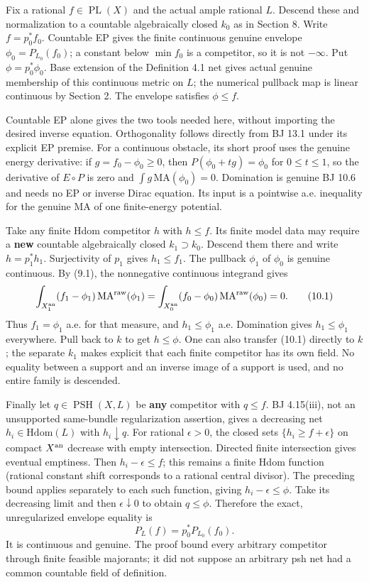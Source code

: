 \documentclass[
  10pt,
]{article}
\begin{document}
Fix a rational \(f\in\operatorname{PL}(X)\) and the actual ample
rational \(L\). Descend these and normalization to a countable
algebraically closed \(k_0\) as in Section 8. Write \(f=p_0^*f_0\).
Countable EP gives the finite continuous genuine envelope
\(\phi_0=P_{L_0}(f_0)\); a constant below \(\min f_0\) is a competitor,
so it is not \(-\infty\). Put \(\phi=p_0^*\phi_0\). Base extension of
the Definition 4.1 net gives actual genuine membership of this
continuous metric on \(L\); the numerical pullback map is linear
continuous by Section 2. The envelope satisfies \(\phi\le f\).

Countable EP alone gives the two tools needed here, without importing
the desired inverse equation. Orthogonality follows directly from BJ
13.1 under its explicit EP premise. For a continuous obstacle, its short
proof uses the genuine energy derivative: if \(g=f_0-\phi_0\ge0\), then
\(P(\phi_0+tg)=\phi_0\) for \(0\le t\le1\), so the derivative of
\(E\circ P\) is zero and \(\int g\,\mathrm{MA}(\phi_0)=0\). Domination
is genuine BJ 10.6 and needs no EP or inverse Dirac equation. Its input
is a pointwise a.e. inequality for the genuine MA of one finite-energy
potential.

Take any finite Hdom competitor \(h\) with \(h\le f\). Its finite model
data may require a \textbf{new} countable algebraically closed
\(k_1\supset k_0\). Descend them there and write \(h=p_1^*h_1\).
Surjectivity of \(p_1\) gives \(h_1\le f_1\). The pullback \(\phi_1\) of
\(\phi_0\) is genuine continuous. By (9.1), the nonnegative continuous
integrand gives
\[\int_{X_1^{\rm an}}(f_1-\phi_1)\,\mathrm{MA}^{\rm raw}(\phi_1)
=\int_{X_0^{\rm an}}(f_0-\phi_0)\,\mathrm{MA}^{\rm raw}(\phi_0)=0.         \tag{10.1}\]
Thus \(f_1=\phi_1\) a.e. for that measure, and \(h_1\le\phi_1\) a.e.
Domination gives \(h_1\le\phi_1\) everywhere. Pull back to \(k\) to get
\(h\le\phi\). One can also transfer (10.1) directly to \(k\); the
separate \(k_1\) makes explicit that each finite competitor has its own
field. No equality between a support and an inverse image of a support
is used, and no entire family is descended.

Finally let \(q\in\operatorname{PSH}(X,L)\) be \textbf{any} competitor
with \(q\le f\). BJ 4.15(iii), not an unsupported same-bundle
regularization assertion, gives a decreasing net
\(h_i\in\mathrm{Hdom}(L)\) with \(h_i\downarrow q\). For rational
\(\epsilon>0\), the closed sets \(\{h_i\ge f+\epsilon\}\) on compact
\(X^{\rm an}\) decrease with empty intersection. Directed finite
intersection gives eventual emptiness. Then \(h_i-\epsilon\le f\); this
remains a finite Hdom function (rational constant shift corresponds to a
rational central divisor). The preceding bound applies separately to
each such function, giving \(h_i-\epsilon\le\phi\). Take its decreasing
limit and then \(\epsilon\downarrow0\) to obtain \(q\le\phi\). Therefore
the exact, unregularized envelope equality is
\[P_L(f)=p_0^*P_{L_0}(f_0).                                             \tag{10.2}\]
It is continuous and genuine. The proof bound every arbitrary competitor
through finite feasible majorants; it did not suppose an arbitrary psh
net had a common countable field of definition.
\end{document}
